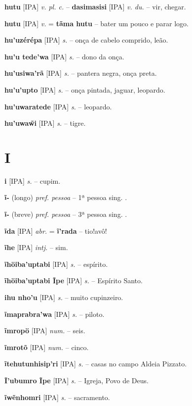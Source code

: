 \textbf{hutu} [IPA] \textit{v. pl. c.} -- \textbf{dasimasisi} [IPA] \textit{v. du.} -- vir, chegar.

\textbf{hutu} [IPA] \textit{v.} = \textbf{tãma hutu} -- bater um pouco e parar logo.

\textbf{hu'uzérépa} [IPA] \textit{s.} -- onça de cabelo comprido, leão.

\textbf{hu'u tede'wa} [IPA] \textit{s.} -- dono da onça.

\textbf{hu'usiwa'rã} [IPA] \textit{s.} -- pantera negra, onça preta.

\textbf{hu'u'upto} [IPA] \textit{s.} -- onça pintada, jaguar, leopardo.

\textbf{hu'uwaratede} [IPA] \textit{s.} -- leopardo.

\textbf{hu'uwaw̃i} [IPA] \textit{s.} -- tigre.



\section*{I}



\textbf{i} [IPA] \textit{s.} -- cupim.

\textbf{ĩ-} (longo) \textit{pref. pessoa} -- 1ª pessoa sing. .

\textbf{ĩ-} (breve) \textit{pref. pessoa} -- 3ª pessoa sing. .

\textbf{ĩda} [IPA] \textit{abr.} = \textbf{ĩ'rada} -- tio!avô!

\textbf{ĩhe} [IPA] \textit{intj.} -- sim.

\textbf{ĩhöiba'uptabi} [IPA] \textit{s.} -- espírito.

\textbf{ĩhöiba'uptabi Ĩpe} [IPA] \textit{s.} -- Espírito Santo.

\textbf{ihu nho'u} [IPA] \textit{s.} -- muito cupinzeiro.

\textbf{ĩmaprabra’wa} [IPA] \textit{s.} -- 
piloto.

\textbf{ĩmropö} [IPA] \textit{num.} -- seis.

\textbf{ĩmrotõ} [IPA] \textit{num.} -- cinco.

\textbf{ĩtehutunhisip'ri} [IPA] \textit{s.} -- casas no campo  Aldeia Pizzato.

\textbf{Ĩ'ubumro Ĩpe} [IPA] \textit{s.} -- Igreja, Povo de Deus.

\textbf{ĩwẽnhomri} [IPA] \textit{s.} -- sacramento.

